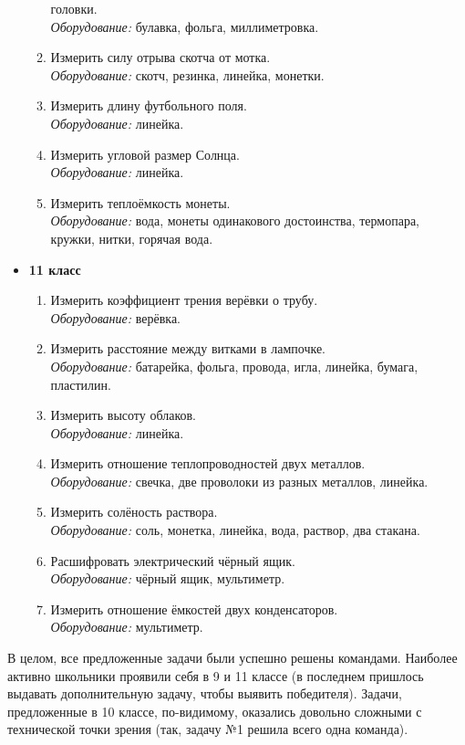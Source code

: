 \documentclass[12pt,a4paper,oneside]{scrartcl}
\newlength{\h}
\newlength{\x}
\begin{document}
\begin{itemize}
\begin{enumerate}
    головки. \\
    \textit{Оборудование:} булавка, фольга, миллиметровка.
  \item Измерить силу отрыва скотча от мотка. \\
    \textit{Оборудование:} скотч, резинка, линейка, монетки.
  \item Измерить длину футбольного поля. \\
    \textit{Оборудование:} линейка.
  \item Измерить угловой размер Солнца. \\
    \textit{Оборудование:} линейка.
  \item Измерить теплоёмкость монеты.\\
    \textit{Оборудование:} вода, монеты одинакового достоинства,
    термопара, кружки, нитки, горячая вода. 
  \end{enumerate}
\item \textbf{11 класс}
  \begin{enumerate}
  \item Измерить коэффициент трения верёвки о трубу. \\
    \textit{Оборудование:} верёвка.
  \item Измерить расстояние между витками в лампочке.\\
    \textit{Оборудование:} батарейка, фольга, провода, игла, линейка,
    бумага, пластилин.
  \item Измерить высоту облаков. \\
    \textit{Оборудование:} линейка.
  \item Измерить отношение теплопроводностей двух металлов. \\
    \textit{Оборудование:} свечка, две проволоки из разных металлов,
    линейка.
  \item Измерить солёность раствора. \\
    \textit{Оборудование:} соль, монетка, линейка, вода, раствор, два
    стакана.
  \item Расшифровать электрический чёрный ящик. \\
    \textit{Оборудование:} чёрный ящик, мультиметр.
  \item Измерить отношение ёмкостей двух конденсаторов. \\
    \textit{Оборудование:} мультиметр. 
  \end{enumerate}
\end{itemize}

В целом, все предложенные задачи были успешно решены
командами. Наиболее активно школьники проявили себя в 9 и 11 классе (в
последнем пришлось выдавать дополнительную задачу, чтобы выявить
победителя). Задачи, предложенные в 10 классе, по-видимому, оказались
довольно сложными с технической точки зрения (так, задачу №1 решила
всего одна команда).
\end{document}
